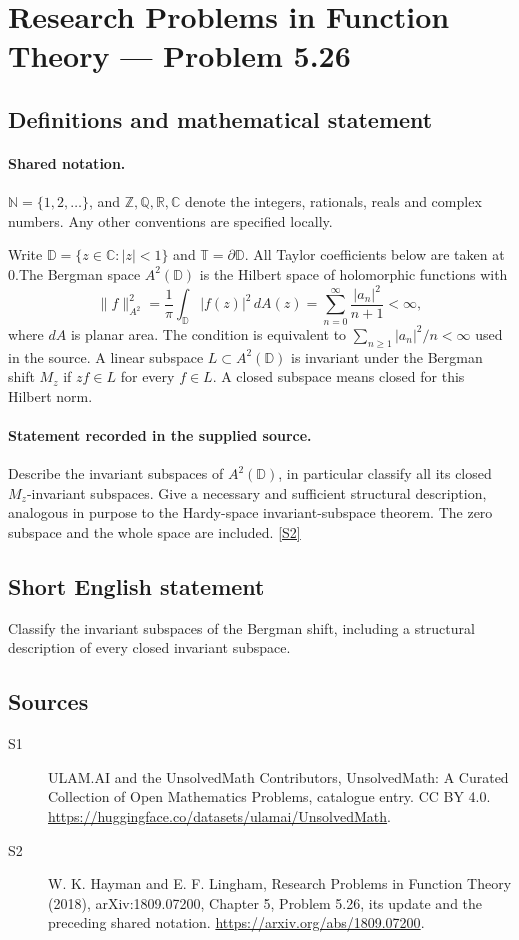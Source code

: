 \documentclass[11pt]{article}
\newcommand{\sref}[2]{\hyperlink{source:#1:#2}{[S#2]}}
\begin{document}
\section{Research Problems in Function Theory — Problem 5.26}\label{statement}

\subsection{Definitions and mathematical statement}

\paragraph{Shared notation.}$\mathbb N=\{1,2,\ldots\}$, and $\mathbb Z,\mathbb Q,\mathbb R,\mathbb C$ denote the integers, rationals, reals and complex numbers. Any other conventions are specified locally.


Write $\mathbb D=\{z\in\mathbb C:|z|<1\}$ and $\mathbb T=\partial\mathbb D$. All Taylor coefficients below are taken at $0$.The Bergman space $A^2(\mathbb D)$ is the Hilbert space of holomorphic functions with
\[\|f\|_{A^2}^2=\frac1\pi\int_{\mathbb D}|f(z)|^2\,dA(z)=\sum_{n=0}^\infty\frac{|a_n|^2}{n+1}<\infty,
\]
where $dA$ is planar area. The condition is equivalent to $\sum_{n\ge1}|a_n|^2/n<\infty$ used in the source. A linear subspace $L\subset A^2(\mathbb D)$ is invariant under the Bergman shift $M_z$ if $zf\in L$ for every $f\in L$. A closed subspace means closed for this Hilbert norm.
\paragraph{Statement recorded in the supplied source.}
Describe the invariant subspaces of $A^2(\mathbb D)$, in particular classify all its closed $M_z$-invariant subspaces. Give a necessary and sufficient structural description, analogous in purpose to the Hardy-space invariant-subspace theorem. The zero subspace and the whole space are included. \sref{statement}{2}
\subsection{Short English statement}
Classify the invariant subspaces of the Bergman shift, including a structural description of every closed invariant subspace.
\subsection{Sources}
\begin{description}
\item[\hypertarget{source:statement:1}{S1}] ULAM.AI and the UnsolvedMath Contributors, UnsolvedMath: A Curated Collection of Open Mathematics Problems, catalogue entry. CC BY 4.0. \url{https://huggingface.co/datasets/ulamai/UnsolvedMath}.
\item[\hypertarget{source:statement:2}{S2}] W. K. Hayman and E. F. Lingham, Research Problems in Function Theory (2018), arXiv:1809.07200, Chapter 5, Problem 5.26, its update and the preceding shared notation. \url{https://arxiv.org/abs/1809.07200}.
\end{description}
\label{end:statement}
\end{document}
